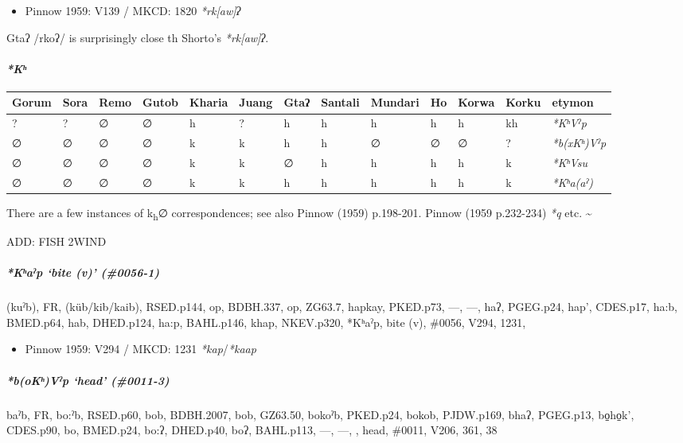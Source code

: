\documentclass[a4paper,]{article}
\providecommand{\tightlist}{%
  \setlength{\itemsep}{0pt}\setlength{\parskip}{0pt}}
\let\oldparagraph\paragraph
\renewcommand{\paragraph}[1]{\oldparagraph{#1}\mbox{}}
\let\oldsubparagraph\subparagraph
\renewcommand{\subparagraph}[1]{\oldsubparagraph{#1}\mbox{}}
\begin{document}
\begin{itemize}
\tightlist
\item
  Pinnow 1959: V139 / MKCD: 1820 \emph{*rk{[}aw{]}ʔ}
\end{itemize}

Gtaʔ /rkoʔ/ is surprisingly close th Shorto's \emph{*rk{[}aw{]}ʔ}.

\paragraph{\texorpdfstring{\emph{*Kʰ}}{*Kʰ}}\label{kux2b0}

\begin{longtable}[]{@{}lllllllllllll@{}}
\toprule
Gorum & Sora & Remo & Gutob & Kharia & Juang & Gtaʔ & Santali & Mundari
& Ho & Korwa & Korku & etymon\tabularnewline
\midrule
\endhead
? & ? & ∅ & ∅ & h & ? & h & h & h & h & h & kh &
\emph{*KʰVˀp}\tabularnewline
∅ & ∅ & ∅ & ∅ & k & k & h & h & ∅ & ∅ & ∅ & ? &
\emph{*b(xKʰ)Vˀp}\tabularnewline
∅ & ∅ & ∅ & ∅ & k & k & ∅ & h & h & h & h & k &
\emph{*KʰVsu}\tabularnewline
∅ & ∅ & ∅ & ∅ & k & k & h & h & h & h & h & k &
\emph{*Kʰa(aˀ)}\tabularnewline
\bottomrule
\end{longtable}

There are a few instances of k\textsubscript{h}∅ correspondences; see
also Pinnow (1959) p.198-201. Pinnow (1959 p.232-234) \emph{*q} etc.
\textasciitilde{}

ADD: FISH 2WIND

\subparagraph{\texorpdfstring{\emph{*Kʰaˀp} `bite (v)'
(\#0056-1)}{*Kʰaˀp bite (v) (\#0056-1)}}\label{kux2b0aux2c0p-bite-v-0056-1}

(kuˀb), FR, (küb/kib/kaib), RSED.p144, op, BDBH.337, op, ZG63.7, hapkay,
PKED.p73, ---, ---, haʔ, PGEG.p24, hap', CDES.p17, ha:b, BMED.p64, hab,
DHED.p124, ha:p, BAHL.p146, khap, NKEV.p320, *Kʰaˀp, bite (v), \#0056,
V294, 1231,

\begin{itemize}
\tightlist
\item
  Pinnow 1959: V294 / MKCD: 1231 \emph{*kap}/\emph{*kaap}
\end{itemize}

\subparagraph{\texorpdfstring{\emph{*b(oKʰ)Vˀp} `head'
(\#0011-3)}{*b(oKʰ)Vˀp head (\#0011-3)}}\label{bokux2b0vux2c0p-head-0011-3}

baˀb, FR, bo:ˀb, RSED.p60, bob, BDBH.2007, bob, GZ63.50, bokoˀb,
PKED.p24, bokob, PJDW.p169, bhaʔ, PGEG.p13, bo̠ho̠k', CDES.p90, bo,
BMED.p24, bo:ʔ, DHED.p40, boʔ, BAHL.p113, ---, ---, , head, \#0011,
V206, 361, 38
\end{document}
